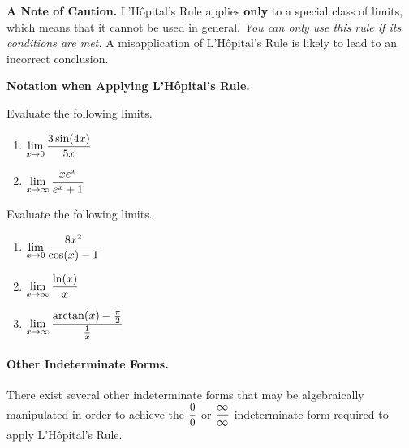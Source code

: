 \documentclass[12pt]{article}
\begin{document}
\vspace{5mm}

\textbf{A Note of Caution.} L'H\^opital's Rule applies \textbf{only} to a special class of limits, which means that it cannot be used in general. \textit{You can only use this rule if its conditions are met.} A misapplication of L'H\^opital's Rule is likely to lead to an incorrect conclusion.

\newpage

\textbf{Notation when Applying L'H\^opital's Rule.}

\vspace{40mm}

\Example Evaluate the following limits.

\begin{enumerate}
\item[\tc{1}] $\displaystyle\lim_{x\to 0}\frac{3\sin(4x)}{5x}$

\vspace{60mm}

\item[\tc{2}] $\displaystyle\lim_{x\to\infty}\frac{xe^x}{e^x+1}$

\end{enumerate}

\newpage

\ExampleCont Evaluate the following limits.

\begin{enumerate}

\item[\tc{3}] $\displaystyle\lim_{x\to 0}\frac{8x^2}{\cos(x)-1}$

\vspace{60mm}

\item[\tc{4}] $\displaystyle\lim_{x\to\infty}\frac{\ln(x)}{x}$

\vspace{60mm}

\item[\tc{5}] $\displaystyle\lim_{x\to\infty}\frac{\arctan(x)-\frac{\pi}{2}}{\frac{1}{x}}$

\end{enumerate}

\newpage

\paragraph{Other Indeterminate Forms.} There exist several other indeterminate forms that may be algebraically manipulated in order to achieve the $\displaystyle\frac{0}{0}$ or $\displaystyle\frac{\infty}{\infty}$ indeterminate form required to apply L'H\^opital's Rule.
\end{document}
